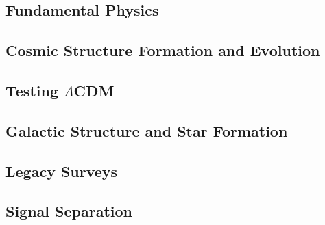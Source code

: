 \documentclass[11pt]{article}
\begin{document}






\subsection{Fundamental Physics} %
\label{sec:fundamentalsci}





\subsection{Cosmic Structure Formation and Evolution} %
\label{sec:extragalacticsci}



\subsection{Testing $\Lambda$CDM} %
\label{sec:testinglcdm}




\subsection{Galactic Structure and Star Formation} %
\label{sec:galacticsci}



\subsection{Legacy Surveys} %
\label{sec:legacy}

%




\subsection{Signal Separation}%
\label{sec:signal_separation}
\end{document}
